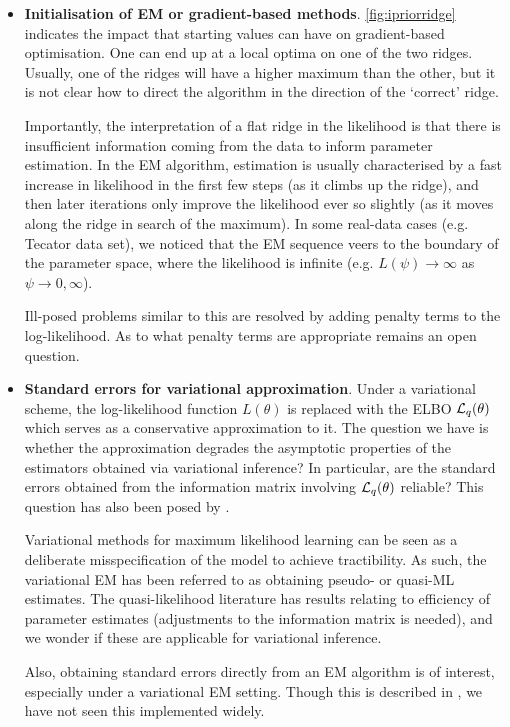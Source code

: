 \documentclass[showframe,11pt,twoside,openright]{report}
\begin{document}
\begin{itemize}
  \item \textbf{Initialisation of EM or gradient-based methods}.
  \cref{fig:ipriorridge} indicates the impact that starting values can have on gradient-based optimisation.
  One can end up at a local optima on one of the two ridges.
  Usually, one of the ridges will have a higher maximum than the other, but it is not clear how to direct the algorithm in the direction of the `correct' ridge.
  
  Importantly, the interpretation of a flat ridge in the likelihood is that there is insufficient information coming  from the data to inform parameter estimation.
  In the EM algorithm, estimation is usually characterised by a fast increase in likelihood in the first few steps (as it climbs up the ridge), and then later iterations only improve the likelihood ever so slightly (as it moves along the ridge in search of the maximum).
  In some real-data cases (e.g. Tecator data set), we noticed that the EM sequence veers to the boundary of the parameter space, where the likelihood is infinite (e.g. $L(\psi) \to \infty$ as $\psi\to 0,\infty$).
  
  Ill-posed problems similar to this are resolved by adding penalty terms to the log-likelihood.
  As to what penalty terms are appropriate remains an open question.
  
  \item \textbf{Standard errors for variational approximation}. 
  Under a variational scheme, the log-likelihood function $L(\theta)$ is replaced with the ELBO ${\mathcal L}_q(\theta)$ which serves as a  conservative approximation to it. 
  The question we have is whether the approximation degrades the asymptotic properties of the estimators obtained via variational inference?
  In particular, are the standard errors obtained from the information matrix involving ${\mathcal L}_q(\theta)$ reliable?
  This question has also been posed by \citet{hall2011asymptotic,bickel2013asymptotic,chen2017use}.
  
  Variational methods for maximum likelihood learning can be seen as a deliberate misspecification of the model to achieve tractibility. 
  As such, the variational EM has been referred to as obtaining pseudo- or quasi-ML estimates.
  The quasi-likelihood literature has results relating to efficiency of parameter estimates (adjustments to the information matrix is needed), and we wonder if these are applicable for variational inference.
  
  Also, obtaining standard errors directly from an EM algorithm is of interest, especially under a variational EM setting.
  Though this is described in \citet[ch. 4]{mclachlan2007algorithm}, we have not seen this implemented widely.
  

\end{itemize}
\end{document}
